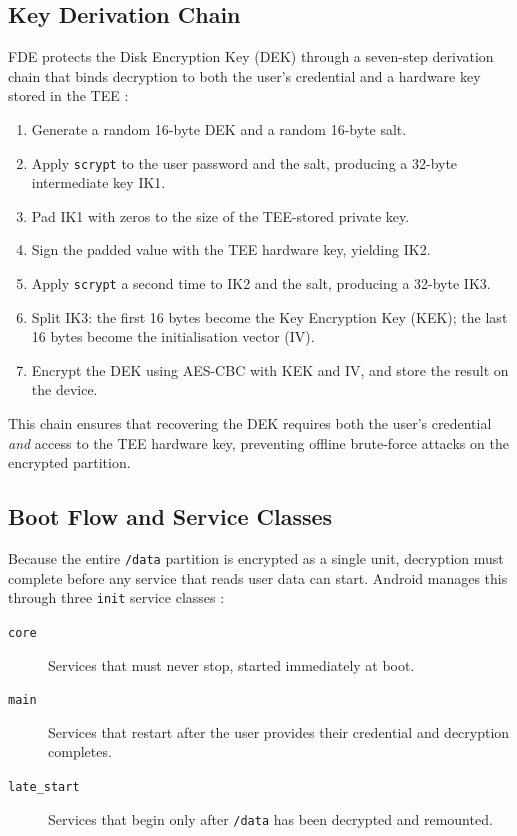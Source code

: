 \subsection{Key Derivation Chain}
\label{sec:bg_fde_keys}

FDE protects the Disk Encryption Key (DEK) through a seven-step derivation chain that binds decryption to both the user's credential and a hardware key stored in the TEE \cite{android_fde}:

\begin{enumerate}
    \item Generate a random 16-byte DEK and a random 16-byte salt.
    \item Apply \texttt{scrypt} to the user password and the salt, producing a 32-byte intermediate key IK1.
    \item Pad IK1 with zeros to the size of the TEE-stored private key.
    \item Sign the padded value with the TEE hardware key, yielding IK2.
    \item Apply \texttt{scrypt} a second time to IK2 and the salt, producing a 32-byte IK3.
    \item Split IK3: the first 16 bytes become the Key Encryption Key (KEK); the last 16 bytes become the initialisation vector (IV).
    \item Encrypt the DEK using AES-CBC with KEK and IV, and store the result on the device.
\end{enumerate}

This chain ensures that recovering the DEK requires both the user's credential \emph{and} access to the TEE hardware key, preventing offline brute-force attacks on the encrypted partition.

\subsection{Boot Flow and Service Classes}
\label{sec:bg_fde_boot}

Because the entire \texttt{/data} partition is encrypted as a single unit, decryption must complete before any service that reads user data can start. Android manages this through three \texttt{init} service classes \cite{android_fde}:

\begin{description}
    \item[\texttt{core}] Services that must never stop, started immediately at boot.
    \item[\texttt{main}] Services that restart after the user provides their credential and decryption completes.
    \item[\texttt{late\_start}] Services that begin only after \texttt{/data} has been decrypted and remounted.
\end{description}


